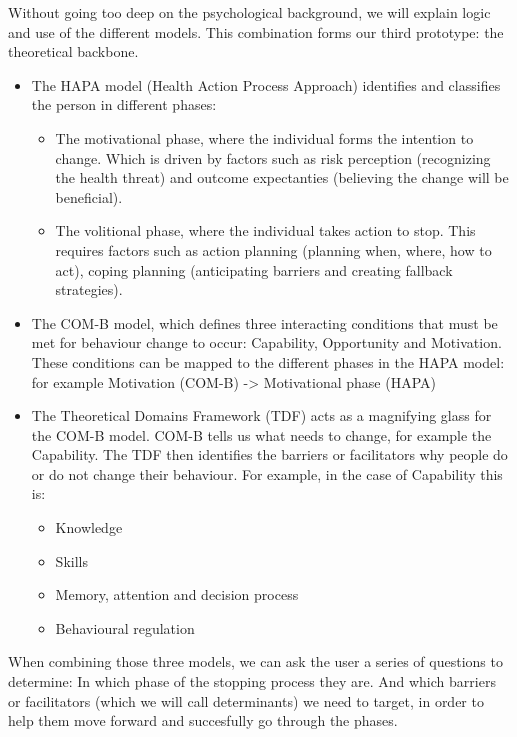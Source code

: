 Without going too deep on the psychological background, we will explain logic and use of the different models.
This combination forms our third prototype: the theoretical backbone.
\begin{itemize}
    \item The HAPA model (Health Action Process Approach) identifies and classifies the person in different phases:
    \begin{itemize}
        \item The motivational phase, where the individual forms the intention to change. Which is driven by factors such as risk perception (recognizing the health threat) and outcome expectanties (believing the change will be beneficial).
        \item The volitional phase, where the individual takes action to stop. This requires factors such as action planning (planning when, where, how to act), coping planning (anticipating barriers and creating fallback strategies).
    \end{itemize}
    \item The COM-B model, which defines three interacting conditions that must be met for behaviour change to occur: Capability, Opportunity and Motivation. These conditions can be mapped to the different phases in the HAPA model: for example Motivation (COM-B) -> Motivational phase (HAPA)
    \item The Theoretical Domains Framework (TDF) acts as a magnifying glass for the COM-B model. COM-B tells us what needs to change, for example the Capability. The TDF then identifies the barriers or facilitators why people do or do not change their behaviour. For example, in the case of Capability this is:
    \begin{itemize}
        \item Knowledge
        \item Skills
        \item Memory, attention and decision process
        \item Behavioural regulation
    \end{itemize}
\end{itemize}

When combining those three models, we can ask the user a series of questions to determine: In which phase of the stopping process they are. 
And which barriers or facilitators (which we will call determinants) we need to target, in order to help them move forward and succesfully go through the phases.

